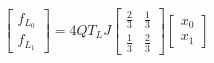 \documentclass[11pt]{article}
\begin{document}
\begin{equation} \label{eq:linSresult}
\begin{bmatrix}
f_{L_0}\\[1ex]
 f_{L_1} 
\end{bmatrix}
= 4QT_L J 
\begin{bmatrix}
\frac{2}{3} & \frac{1}{3}  \\[1ex]
 \frac{1}{3}  & \frac{2}{3}
\end{bmatrix}
\begin{bmatrix}
x_{0} \\[1ex] x_{1} 
\end{bmatrix}
\end{equation}



%



%
%
%
%
\end{document}
